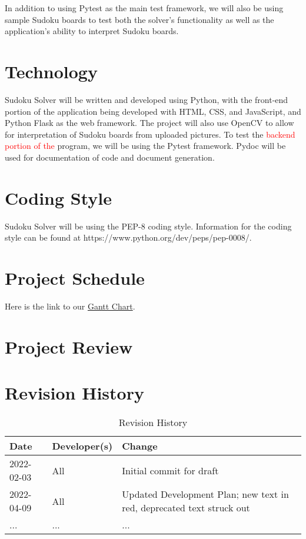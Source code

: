 \documentclass[11pt]{article}
\begin{document}
In addition to using Pytest as the main test framework, we will also be using sample Sudoku boards to test both the solver's functionality as well as the application's ability to interpret Sudoku boards.

\section{Technology}

Sudoku Solver will be written and developed using Python, with the front-end portion of the application being developed with HTML, CSS, and JavaScript, and Python Flask as the web framework. The project will also use OpenCV to allow for interpretation of Sudoku boards from uploaded pictures. To test the \textcolor{red}{backend portion of the }program, we will be using the Pytest framework. Pydoc will be used for documentation of code and document generation.

\section{Coding Style}

Sudoku Solver will be using the PEP-8 coding style. Information for the coding style can be found at https://www.python.org/dev/peps/pep-0008/. 

\section{Project Schedule}

Here is the link to our  \href{https://gitlab.cas.mcmaster.ca/bhuiyr2/sudokusolver_l02_grp08/-/blob/main/ProjectSchedule/Gantt_Sudoku.gan}{Gantt Chart}.

\section{Project Review}

\section{Revision History}
\begin{table}[hp]
\caption{Revision History} \label{TblRevisionHistory}
\begin{tabularx}{\textwidth}{llX}
\toprule
\textbf{Date} & \textbf{Developer(s)} & \textbf{Change}\\
\midrule
2022-02-03 & All & Initial commit for draft\\
2022-04-09 & All & Updated Development Plan; new text in red, deprecated text struck out\\
... & ... & ...\\
\bottomrule
\end{tabularx}
\end{table}
\end{document}
